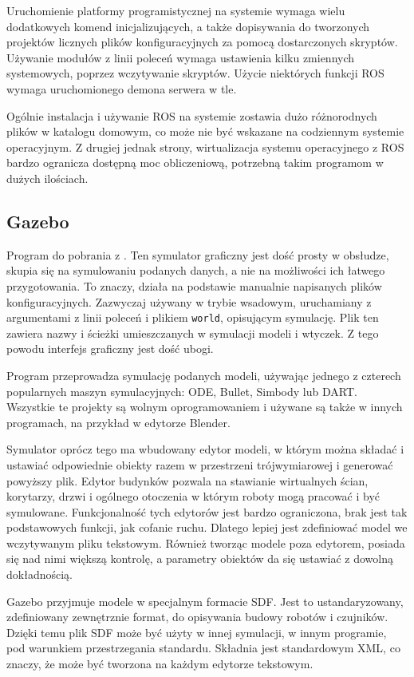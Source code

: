 		Uruchomienie platformy programistycznej na systemie wymaga wielu dodatkowych komend inicjalizujących, 
		a także dopisywania do tworzonych projektów licznych plików konfiguracyjnych za pomocą dostarczonych skryptów.
		Używanie modułów z linii poleceń wymaga ustawienia kilku zmiennych systemowych, poprzez wczytywanie skryptów.
		Użycie niektórych funkcji ROS wymaga uruchomionego demona serwera w tle.

		Ogólnie instalacja i używanie ROS na systemie zostawia dużo różnorodnych plików w katalogu domowym, co może nie być wskazane na codziennym systemie operacyjnym.
		Z drugiej jednak strony, wirtualizacja systemu operacyjnego z ROS bardzo ogranicza dostępną moc obliczeniową, potrzebną takim programom w dużych ilościach.

	\subsection{Gazebo}
		Program do pobrania z \cite{gazebo_website}. 
		Ten symulator graficzny jest dość prosty w obsłudze, skupia się na symulowaniu podanych danych, a nie na możliwości ich łatwego przygotowania.
		To znaczy, działa na podstawie manualnie napisanych plików konfiguracyjnych.
		Zazwyczaj używany w trybie wsadowym, uruchamiany z argumentami z linii poleceń i plikiem \texttt{world}, opisującym symulację.
		Plik ten zawiera nazwy i ścieżki umieszczanych w symulacji modeli i wtyczek.
		Z tego powodu interfejs graficzny jest dość ubogi.

		Program przeprowadza symulację podanych modeli, używając jednego z czterech popularnych maszyn symulacyjnych: ODE, Bullet, Simbody lub DART.
		Wszystkie te projekty są wolnym oprogramowaniem i używane są także w innych programach, na przykład w edytorze Blender.

		Symulator oprócz tego ma wbudowany edytor modeli, w którym można składać i ustawiać odpowiednie obiekty razem w przestrzeni trójwymiarowej
		i generować powyższy plik.
		Edytor budynków pozwala na stawianie wirtualnych ścian, korytarzy, drzwi i ogólnego otoczenia w którym roboty mogą pracować i być symulowane.
		Funkcjonalność tych edytorów jest bardzo ograniczona, brak jest tak podstawowych funkcji, jak cofanie ruchu.
		Dlatego lepiej jest zdefiniować model we wczytywanym pliku tekstowym.
		Również tworząc modele poza edytorem, posiada się nad nimi większą kontrolę, a parametry obiektów da się ustawiać z dowolną dokładnością.

		Gazebo przyjmuje modele w specjalnym formacie SDF. Jest to ustandaryzowany, zdefiniowany zewnętrznie format, do opisywania budowy robotów i czujników.
		Dzięki temu plik SDF może być użyty w innej symulacji, w innym programie, pod warunkiem przestrzegania standardu.
		Składnia jest standardowym XML, co znaczy, że może być tworzona na każdym edytorze tekstowym.

